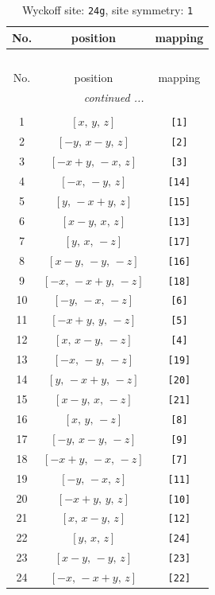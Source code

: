 \documentclass[fleqn,8pt]{jsarticle}
\begin{document}
\begin{longtable}{ccc}
\caption{Wyckoff site: {\tt 24g}, site symmetry: {\tt 1}}
 \\
 \hline \hline
No. & position & mapping \\ \hline \endfirsthead

\multicolumn{2}{l}{\tablename\ \thetable{}} \\
 \hline \hline
No. & position & mapping \\ \hline \endhead

 \hline \hline
\multicolumn{2}{r}{\footnotesize\it continued ...} \\ \endfoot

 \hline \hline
\multicolumn{2}{r}{} \\ \endlastfoot

1 & $\left[ x,\, y,\, z \right]$ & {\tt [1]} \\ \hline
2 & $\left[ - y,\, x - y,\, z \right]$ & {\tt [2]} \\ \hline
3 & $\left[ - x + y,\, - x,\, z \right]$ & {\tt [3]} \\ \hline
4 & $\left[ - x,\, - y,\, z \right]$ & {\tt [14]} \\ \hline
5 & $\left[ y,\, - x + y,\, z \right]$ & {\tt [15]} \\ \hline
6 & $\left[ x - y,\, x,\, z \right]$ & {\tt [13]} \\ \hline
7 & $\left[ y,\, x,\, - z \right]$ & {\tt [17]} \\ \hline
8 & $\left[ x - y,\, - y,\, - z \right]$ & {\tt [16]} \\ \hline
9 & $\left[ - x,\, - x + y,\, - z \right]$ & {\tt [18]} \\ \hline
10 & $\left[ - y,\, - x,\, - z \right]$ & {\tt [6]} \\ \hline
11 & $\left[ - x + y,\, y,\, - z \right]$ & {\tt [5]} \\ \hline
12 & $\left[ x,\, x - y,\, - z \right]$ & {\tt [4]} \\ \hline
13 & $\left[ - x,\, - y,\, - z \right]$ & {\tt [19]} \\ \hline
14 & $\left[ y,\, - x + y,\, - z \right]$ & {\tt [20]} \\ \hline
15 & $\left[ x - y,\, x,\, - z \right]$ & {\tt [21]} \\ \hline
16 & $\left[ x,\, y,\, - z \right]$ & {\tt [8]} \\ \hline
17 & $\left[ - y,\, x - y,\, - z \right]$ & {\tt [9]} \\ \hline
18 & $\left[ - x + y,\, - x,\, - z \right]$ & {\tt [7]} \\ \hline
19 & $\left[ - y,\, - x,\, z \right]$ & {\tt [11]} \\ \hline
20 & $\left[ - x + y,\, y,\, z \right]$ & {\tt [10]} \\ \hline
21 & $\left[ x,\, x - y,\, z \right]$ & {\tt [12]} \\ \hline
22 & $\left[ y,\, x,\, z \right]$ & {\tt [24]} \\ \hline
23 & $\left[ x - y,\, - y,\, z \right]$ & {\tt [23]} \\ \hline
24 & $\left[ - x,\, - x + y,\, z \right]$ & {\tt [22]} \\
\end{longtable}
\end{document}
